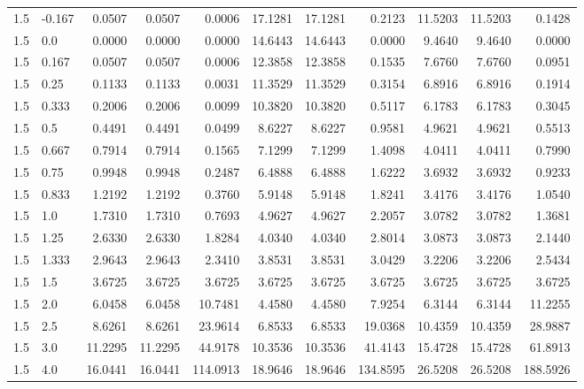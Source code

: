 \begin{landscape}
\begin{table}[h!]
\begin{tabular}{ll rrr rrr rrr}
   1.5 & -0.167 & 0.0507  & 0.0507  & 0.0006     & 17.1281 & 17.1281 & 0.2123     & 11.5203 & 11.5203 & 0.1428 \\
   1.5 & 0.0    & 0.0000  & 0.0000  & 0.0000     & 14.6443 & 14.6443 & 0.0000     & 9.4640  & 9.4640  & 0.0000 \\
   1.5 & 0.167  & 0.0507  & 0.0507  & 0.0006     & 12.3858 & 12.3858 & 0.1535     & 7.6760  & 7.6760  & 0.0951 \\
   1.5 & 0.25   & 0.1133  & 0.1133  & 0.0031     & 11.3529 & 11.3529 & 0.3154     & 6.8916  & 6.8916  & 0.1914 \\
   1.5 & 0.333  & 0.2006  & 0.2006  & 0.0099     & 10.3820 & 10.3820 & 0.5117     & 6.1783  & 6.1783  & 0.3045 \\
   1.5 & 0.5    & 0.4491  & 0.4491  & 0.0499     & 8.6227  & 8.6227  & 0.9581     & 4.9621  & 4.9621  & 0.5513 \\
   1.5 & 0.667  & 0.7914  & 0.7914  & 0.1565     & 7.1299  & 7.1299  & 1.4098     & 4.0411  & 4.0411  & 0.7990 \\
   1.5 & 0.75   & 0.9948  & 0.9948  & 0.2487     & 6.4888  & 6.4888  & 1.6222     & 3.6932  & 3.6932  & 0.9233 \\
   1.5 & 0.833  & 1.2192  & 1.2192  & 0.3760     & 5.9148  & 5.9148  & 1.8241     & 3.4176  & 3.4176  & 1.0540 \\
   1.5 & 1.0    & 1.7310  & 1.7310  & 0.7693     & 4.9627  & 4.9627  & 2.2057     & 3.0782  & 3.0782  & 1.3681 \\
   1.5 & 1.25   & 2.6330  & 2.6330  & 1.8284     & 4.0340  & 4.0340  & 2.8014     & 3.0873  & 3.0873  & 2.1440 \\
   1.5 & 1.333  & 2.9643  & 2.9643  & 2.3410     & 3.8531  & 3.8531  & 3.0429     & 3.2206  & 3.2206  & 2.5434 \\
   1.5 & 1.5    & 3.6725  & 3.6725  & 3.6725     & 3.6725  & 3.6725  & 3.6725     & 3.6725  & 3.6725  & 3.6725 \\
   1.5 & 2.0    & 6.0458  & 6.0458  & 10.7481    & 4.4580  & 4.4580  & 7.9254     & 6.3144  & 6.3144  & 11.2255 \\
   1.5 & 2.5    & 8.6261  & 8.6261  & 23.9614    & 6.8533  & 6.8533  & 19.0368    & 10.4359 & 10.4359 & 28.9887 \\
   1.5 & 3.0    & 11.2295 & 11.2295 & 44.9178    & 10.3536 & 10.3536 & 41.4143    & 15.4728 & 15.4728 & 61.8913 \\
   1.5 & 4.0    & 16.0441 & 16.0441 & 114.0913   & 18.9646 & 18.9646 & 134.8595   & 26.5208 & 26.5208 & 188.5926 \\

\end{tabular}
\end{table}
\end{landscape}
